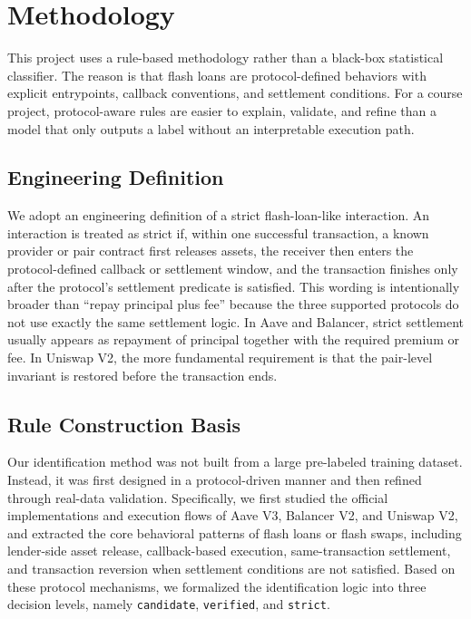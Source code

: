 \section{Methodology}

This project uses a rule-based methodology rather than a black-box statistical classifier. The reason is that flash loans are protocol-defined behaviors with explicit entrypoints, callback conventions, and settlement conditions. For a course project, protocol-aware rules are easier to explain, validate, and refine than a model that only outputs a label without an interpretable execution path.

\subsection{Engineering Definition}

We adopt an engineering definition of a strict flash-loan-like interaction. An interaction is treated as strict if, within one successful transaction, a known provider or pair contract first releases assets, the receiver then enters the protocol-defined callback or settlement window, and the transaction finishes only after the protocol's settlement predicate is satisfied. This wording is intentionally broader than ``repay principal plus fee'' because the three supported protocols do not use exactly the same settlement logic. In Aave and Balancer, strict settlement usually appears as repayment of principal together with the required premium or fee. In Uniswap V2, the more fundamental requirement is that the pair-level invariant is restored before the transaction ends.

\subsection{Rule Construction Basis}

Our identification method was not built from a large pre-labeled training dataset. Instead, it was first designed in a protocol-driven manner and then refined through real-data validation. Specifically, we first studied the official implementations and execution flows of Aave V3, Balancer V2, and Uniswap V2, and extracted the core behavioral patterns of flash loans or flash swaps, including lender-side asset release, callback-based execution, same-transaction settlement, and transaction reversion when settlement conditions are not satisfied. Based on these protocol mechanisms, we formalized the identification logic into three decision levels, namely \texttt{candidate}, \texttt{verified}, and \texttt{strict}.

